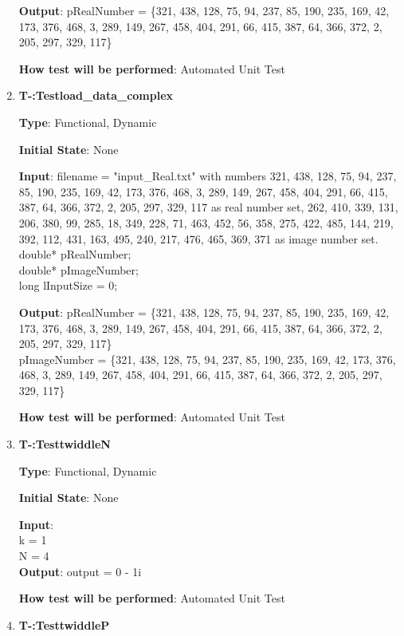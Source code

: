 \documentclass[12pt, titlepage]{article}
\newcounter{tnum}
\begin{document}
\begin{enumerate}
\textbf {Output}:  pRealNumber = \{321, 438, 128, 75, 94, 237, 85, 190, 235, 169, 42, 
173, 376, 468, 3, 289, 149, 267, 458, 404, 291, 66, 415, 387, 64, 366, 372, 2, 205, 297, 329, 117\}
					
\textbf {How test will be performed}: Automated Unit Test

\item{\textbf{T-\thetnum \label{CCA}:Testload\_data\_complex}}

\textbf {Type}: Functional, Dynamic
					
\textbf {Initial State}: None
					
\textbf {Input}: filename = "input\_Real.txt"  with numbers 321, 438, 128, 75, 94, 237, 85, 190, 235, 169, 42, 
173, 376, 468, 3, 289, 149, 267, 458, 404, 291, 66, 415, 387, 64, 366, 372, 2, 205, 297, 329, 117  as real number set, 262, 410, 339, 131, 206,
 380, 99, 285, 18, 349, 228, 71, 463, 452, 56, 358, 275, 422, 485, 144, 219, 392, 112, 431, 163, 495, 240, 217, 476, 465, 369, 371 as image number set.\\
double* pRealNumber;\\
double* pImageNumber;\\
long lInputSize = 0;
					
\textbf {Output}:  pRealNumber = \{321, 438, 128, 75, 94, 237, 85, 190, 235, 169, 42, 
173, 376, 468, 3, 289, 149, 267, 458, 404, 291, 66, 415, 387, 64, 366, 372, 2, 205, 297, 329, 117\}\\
pImageNumber = \{321, 438, 128, 75, 94, 237, 85, 190, 235, 169, 42, 
173, 376, 468, 3, 289, 149, 267, 458, 404, 291, 66, 415, 387, 64, 366, 372, 2, 205, 297, 329, 117\}
					
\textbf {How test will be performed}:  Automated Unit Test


\item{\textbf{T-\thetnum \label{FZ}:TesttwiddleN}}

\textbf {Type}: Functional, Dynamic
					
\textbf {Initial State}: None
					
\textbf {Input}:\\
k = 1\\
N = 4	\\				
\textbf {Output}:  output = 0 - 1i
					
\textbf {How test will be performed}:  Automated Unit Test


\item{\textbf{T-\thetnum \label{R2P}:TesttwiddleP}}


\end{enumerate}
\end{document}

